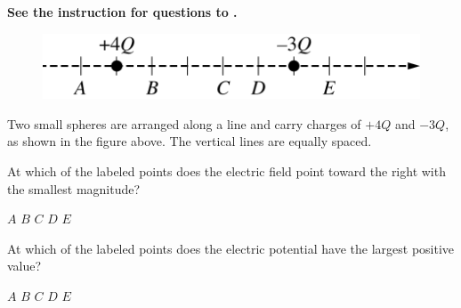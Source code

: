 \textbf{See the instruction for questions  to .}

\begin{figure}[H]
    \centering
    \includegraphics[scale=0.3]{images/img-013-021.png}
\end{figure}

Two small spheres are arranged along a line and carry charges of $+4 Q$ and $-3 Q$, as shown in the figure above. The vertical lines are equally spaced.

\begin{questions}\setcounter{question}{28}\question
At which of the labeled points does the electric field point toward the right with the smallest magnitude?

\begin{oneparchoices}
\choice $A$
\choice $B$
\choice $C$
\choice $D$
\choice $E$
\end{oneparchoices}\end{questions}

\begin{questions}\setcounter{question}{29}\question
At which of the labeled points does the electric potential have the largest positive value?

\begin{oneparchoices}
\choice $A$
\choice $B$
\choice $C$
\choice $D$
\choice $E$
\end{oneparchoices}\end{questions}

